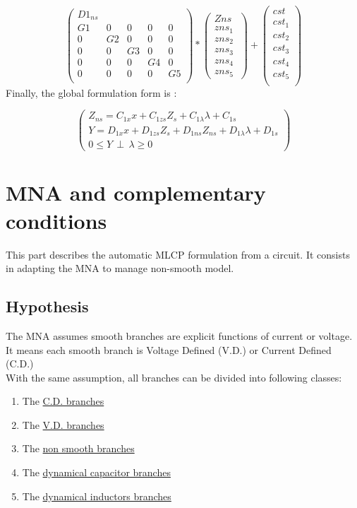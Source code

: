 \[
\left(\begin{array}{ccccc}
  D1_{ns}\\
  \hline
  G1&0&0&0&0\\
  0&G2&0&0&0\\
  0&0&G3&0&0\\
  0&0&0&G4&0\\
  0&0&0&0&G5\\
\end{array}\right)*
\left(\begin{array}{c}
  Zns\\
  \hline
   zns_{1} \\
   zns_{2}\\
   zns_{3}\\
   zns_{4}\\
   zns_{5}\
\end{array}\right)+
\left(\begin{array}{c}
  cst\\
  \hline
   cst_{1} \\
   cst_{2}\\
   cst_{3}\\
   cst_{4}\\
   cst_{5}\\
\end{array}\right)
\]
Finally, the global formulation form is : 

\[\left(\begin{array}{c}
Z_{ns}= C_{1x}x+C_{1zs}Z_{s}+C_{1\lambda}\lambda +C_{1s}\\
Y=D_{1x}x +D_{1zs}Z_{s}+D_{1ns}Z_{ns}+D_{1\lambda}\lambda+D_{1s}\\
0 \leq Y \, \perp \, \lambda \geq 0
\end{array}\right)\]
\newpage
\section{MNA and complementary conditions}
This part describes the automatic MLCP formulation from a circuit. It consists in adapting the
MNA to manage non-smooth model.

\subsection{Hypothesis}
The MNA assumes smooth branches are explicit functions of current or voltage. It means each smooth
branch is Voltage Defined (V.D.) or Current Defined (C.D.)\\

With the same assumption, all branches can be divided into following classes:\\
\begin{enumerate}
\item The  \underline{C.D. branches} 
\item The  \underline{V.D. branches}
 \item The  \underline{non smooth branches}
 \item The \underline{dynamical capacitor branches}
 \item The \underline{dynamical inductors branches}
\end{enumerate}



